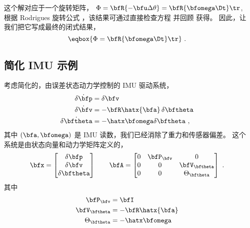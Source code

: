 \bigskip
这个解对应于一个旋转矩阵， $\Phi=\bfR\{-\bfu\Delta\theta\} = \bfR\{\bfomega\Dt\}\tr$, 根据 Rodrigues 旋转公式  ，该结果可通过直接检查方程  并回顾  获得。
因此，让我们把它写成最终的闭式结果，
%
\begin{equation}
\eqbox{\Phi=\bfR\{\bfomega\Dt\}\tr}~.
\end{equation}

\subsection{简化 IMU 示例}
\label{sec:IMUexample}

考虑简化的，由误差状态动力学控制的 IMU 驱动系统，
%
\begin{subequations}
%
\begin{align}
\dot{\delta\bfp}   &= \delta\bfv \\
\dot{\delta\bfv}   &= -\bfR\hatx{\bfa}\,\delta\bftheta \\
\dot{\delta\bftheta} &= -\hatx\bfomega\delta\bftheta~,
\end{align}%
\end{subequations}%
%
其中 $(\bfa,\bfomega)$ 是 IMU 读数，我们已经消除了重力和传感器偏差。 
这个系统是由状态向量和动力学矩阵定义的，
%
\begin{equation}
\bfx = \begin{bmatrix}
\delta\bfp \\ \delta\bfv \\ \delta\bftheta
\end{bmatrix}
\qquad
\bfA = \begin{bmatrix}
0 & \bfP_\bfv & 0 \\
0 & 0 & \bfV_\bftheta \\
0 & 0 & \Theta_\bftheta
\end{bmatrix}~.
\end{equation}
%
其中
%
%
\begin{align}
\bfP_\bfv &= \bfI \\
\bfV_\bftheta &= -\bfR\hatx{\bfa} \\
\Theta_\bftheta &= -\hatx\bfomega \label{equ:ThetaThetaDef}
\end{align}%


